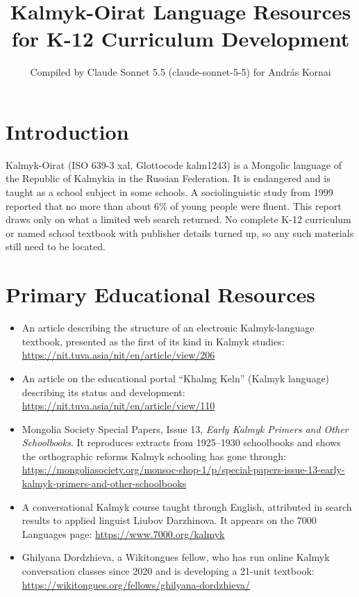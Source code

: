 \documentclass[12pt]{article}
\title{Kalmyk-Oirat Language Resources for K-12 Curriculum Development}
\author{Compiled by Claude Sonnet 5.5 (claude-sonnet-5-5) for Andr\'as Kornai}
\date{}
\begin{document}
\maketitle

\section{Introduction}
Kalmyk-Oirat (ISO 639-3 xal, Glottocode kalm1243) is a Mongolic language of the Republic of Kalmykia in the Russian Federation. It is endangered and is taught as a school subject in some schools. A sociolinguistic study from 1999 reported that no more than about 6\% of young people were fluent. This report draws only on what a limited web search returned. No complete K-12 curriculum or named school textbook with publisher details turned up, so any such materials still need to be located.

\section{Primary Educational Resources}
\begin{itemize}
\item An article describing the structure of an electronic Kalmyk-language textbook, presented as the first of its kind in Kalmyk studies: \url{https://nit.tuva.asia/nit/en/article/view/206}
\item An article on the educational portal ``Khalmg Keln'' (Kalmyk language) describing its status and development: \url{https://nit.tuva.asia/nit/en/article/view/110}
\item Mongolia Society Special Papers, Issue 13, \emph{Early Kalmyk Primers and Other Schoolbooks}. It reproduces extracts from 1925--1930 schoolbooks and shows the orthographic reforms Kalmyk schooling has gone through: \url{https://mongoliasociety.org/monsoc-shop-1/p/special-papers-issue-13-early-kalmyk-primers-and-other-schoolbooks}
\item A conversational Kalmyk course taught through English, attributed in search results to applied linguist Liubov Darzhinova. It appears on the 7000 Languages page: \url{https://www.7000.org/kalmyk}
\item Ghilyana Dordzhieva, a Wikitongues fellow, who has run online Kalmyk conversation classes since 2020 and is developing a 21-unit textbook: \url{https://wikitongues.org/fellows/ghilyana-dordzhieva/}
\end{itemize}
\end{document}

